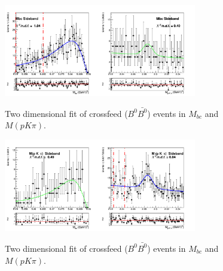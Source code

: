 \begin{figure}[H]
\centering
{\includegraphics[width=0.75\textwidth]{06-chargedAnticorrBtoLambda/figs/Mbc_Sideband_stream1_Crossfeed_charged_anticorrLambdaC_2Dfit.png}}
\caption{Two dimensional fit of crossfeed ($B^0\bar{B^0}$) events in $M_{bc}$  and $M(p K \pi)$.}
\label{fig:Mbc_Sideband_stream1_Crossfeed_charged_anticorrLambdaC_2Dfit}
\end{figure}


\begin{figure}[H]
\centering
{\includegraphics[width=0.75\textwidth]{06-chargedAnticorrBtoLambda/figs/InvM_Sideband_stream1_Crossfeed_charged_anticorrLambdaC_2Dfit.png}}
\caption{Two dimensional fit of crossfeed ($B^0\bar{B^0}$) events in $M_{bc}$  and $M(p K \pi)$.}
\label{fig:InvM_Sideband_stream1_Crossfeed_charged_anticorrLambdaC_2Dfit}
\end{figure}


\vspace{2.5 cm}

